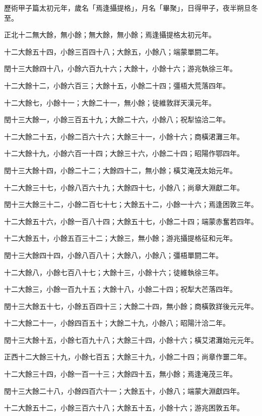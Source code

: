 \begin{pinyinscope}
歷術甲子篇太初元年，歲名「焉逢攝提格」，月名「畢聚」，日得甲子，夜半朔旦冬至。

正北十二無大餘，無小餘；無大餘，無小餘；焉逢攝提格太初元年。

十二大餘五十四，小餘三百四十八；大餘五，小餘八；端蒙單閼二年。

閏十三大餘四十八，小餘六百九十六；大餘十，小餘十六；游兆執徐三年。

十二大餘十二，小餘六百三；大餘十五，小餘二十四；彊梧大荒落四年。

十二大餘七，小餘十一；大餘二十一，無小餘；徒維敦牂天漢元年。

閏十三大餘一，小餘三百五十九；大餘二十六，小餘八；祝犁協洽二年。

十二大餘二十五，小餘二百六十六；大餘三十一，小餘十六；商橫涒灘三年。

十二大餘十九，小餘六百一十四；大餘三十六，小餘二十四；昭陽作鄂四年。

閏十三大餘十四，小餘二十二；大餘四十二，無小餘；橫艾淹茂太始元年。

十二大餘三十七，小餘八百六十九；大餘四十七，小餘八；尚章大淵獻二年。

閏十三大餘三十二，小餘二百七十七；大餘五十二，小餘一十六；焉逢困敦三年。

十二大餘五十六，小餘一百八十四；大餘五十七，小餘二十四；端蒙赤奮若四年。

十二大餘五十，小餘五百三十二；大餘三，無小餘；游兆攝提格征和元年。

閏十三大餘四十四，小餘八百八十；大餘八，小餘八；彊梧單閼二年。

十二大餘八，小餘七百八十七；大餘十三，小餘十六；徒維執徐三年。

十二大餘三，小餘一百九十五；大餘十八，小餘二十四；祝犁大芒落四年。

閏十三大餘五十七，小餘五百四十三；大餘二十四，無小餘；商橫敦牂後元元年。

十二大餘二十一，小餘四百五十；大餘二十九，小餘八；昭陽汁洽二年。

閏十三大餘十五，小餘七百九十八；大餘三十四，小餘十六；橫艾涒灘始元元年。

正西十二大餘三十九，小餘七百五；大餘三十九，小餘二十四；尚章作噩二年。

十二大餘三十四，小餘一百一十三；大餘四十五，無小餘；焉逢淹茂三年。

閏十三大餘二十八，小餘四百六十一；大餘五十，小餘八；端蒙大淵獻四年。

十二大餘五十二，小餘三百六十八；大餘五十五，小餘十六；游兆困敦五年。


\end{pinyinscope}
